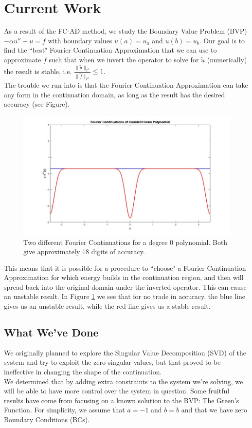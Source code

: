 \documentclass[11pt]{amsart}
\begin{document}
\section{Current Work}
As a result of the FC-AD method, we study the Boundary Value Problem (BVP) $-\alpha u'' + u=f$ with boundary values $u(a)=u_a$ and $u(b)=u_b$.  Our goal is to find the ``best" Fourier Continuation Approximation that we can use to approximate $f$ such that when we invert the operator to solve for $\tilde{u}$ (numerically) the result is stable, i.e. $\frac{\|\tilde{u}\|_{\ell^2}}{\|\tilde{f}\|_{\ell^2}} \leq 1$.  \\
The trouble we run into is that the Fourier Continuation Approximation can take any form in the continuation domain, as long as the result has the desired accuracy (see Figure). 
\begin{figure}
\begin{center}
\includegraphics[scale = .4]{FourierContinuations.jpg}
\caption{Two different Fourier Continuations for a degree 0 polynomial. Both give approximately 18 digits of accuracy.}
\label{fig:Fig1}
\end{center}
\end{figure}
This means that it is possible for a procedure to ``choose" a Fourier Continuation Approximation for which energy builds in the continuation region, and then will spread back into the original domain under the inverted operator.  This can cause an unstable result.  In Figure \ref{fig:Fig1} we see that for no trade in accuracy, the blue line gives us an unstable result, while the red line gives us a stable result. \\

\subsection{What We've Done} 
We originally planned to explore the Singular Value Decomposition (SVD) of the system and try to exploit the zero singular values, but that proved to be ineffective in changing the shape of the continuation.  \\
We determined that by adding extra constraints to the system we're solving, we will be able to have more control over the system in question. Some fruitful results have come from focusing on a known solution to the BVP: The Green's Function. For simplicity, we assume that $a=-1$ and $b=b$ and that we have zero Boundary Conditions (BCs). 
\end{document}
